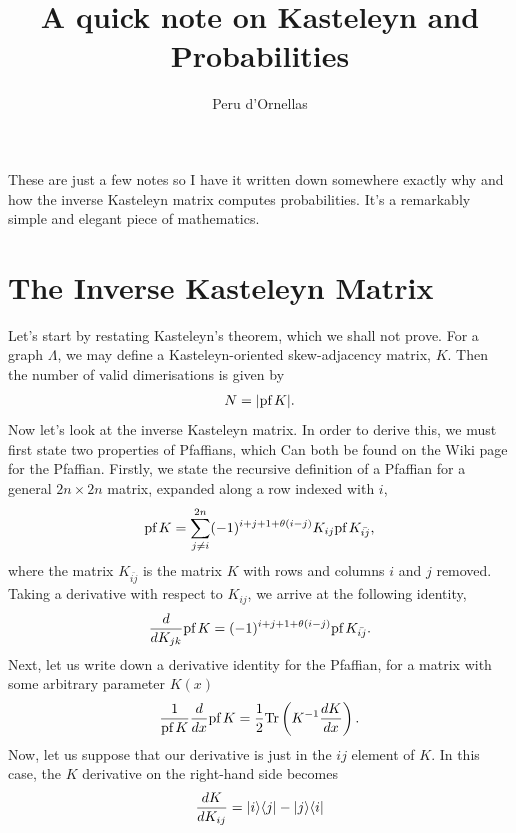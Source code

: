 \documentclass[11pt, oneside]{article} %
\title{A quick note on Kasteleyn and Probabilities}
\author{Peru d'Ornellas}
\numberwithin{equation}{section}
\begin{document}
\maketitle

These are just a few notes so I have it written down somewhere exactly why and how the inverse Kasteleyn matrix computes probabilities. It's a remarkably simple and elegant piece of mathematics. 





\section{The Inverse Kasteleyn Matrix}

Let's start by restating Kasteleyn's theorem, which we shall not prove. For a graph $\Lambda$, we may define a Kasteleyn-oriented  skew-adjacency matrix, $K$. Then the number of valid dimerisations is given by 
\begin{align}
    N = |\textup{pf}\, K|.
\end{align}
Now let's look at the inverse Kasteleyn matrix. In order to derive this, we must first state two properties of Pfaffians, which Can both be found on the Wiki page for the Pfaffian. Firstly, we state the recursive definition of a Pfaffian for a general $2n \times 2n$ matrix, expanded along a row indexed with $i$,
\begin{align}
    \textup{pf}\, K = \sum_{j\neq i}^{2n} (-1)^{i+j+1+\theta(i-j)} K_{ij} \textup{pf}\,{K_{\bar {ij}}},
\end{align}
where the matrix $K_{\bar {ij}}$ is the matrix $K$ with rows and columns $i$ and $j$ removed. Taking a derivative with respect to $K_{ij}$, we arrive at the following identity,
\begin{align}\label{eqn:kij_recursive}
    \frac{d}{d{K_{jk}}} \textup{pf}\, K 
    = (-1)^{i+j+1+\theta(i-j)} \textup{pf}\,{K_{\bar {ij}}}.
\end{align}
Next, let us write down a derivative identity for the Pfaffian, for a matrix with some arbitrary parameter $K(x)$
\begin{align} \label{eqn:deriv}
    \frac{1}{\textup{pf}\, K} \frac d {dx} \textup{pf}\, K = \frac 12 \textup{Tr} \left ( K^{-1} \frac{dK}{dx}\right ).
\end{align}
Now, let us suppose that our derivative is just in the $ij$ element of $K$. In this case, the $K$ derivative on the right-hand side becomes
\begin{align}
    \frac {dK}{dK_{ij}} = \ket{i}\!\bra{j} - \ket{j}\!\bra{i}
\end{align}
\end{document}
